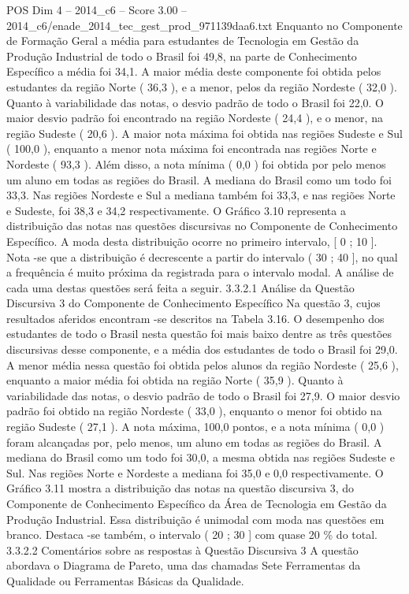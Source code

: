 \begin{textsample}{POS Dim 4 – 2014\_c6 – Score 3.00 – 2014\_c6/enade\_2014\_tec\_gest\_prod\_971139daa6.txt}
Enquanto no Componente de Formação Geral a média para estudantes de Tecnologia em Gestão da Produção Industrial de todo o Brasil foi 49,8, na parte de Conhecimento Específico a média foi 34,1.
A maior média deste componente foi obtida pelos estudantes da região Norte ( 36,3 ), e a menor, pelos da região Nordeste ( 32,0 ).
Quanto à variabilidade das notas, o desvio padrão de todo o Brasil foi 22,0.
O maior desvio padrão foi encontrado na região Nordeste ( 24,4 ), e o menor, na região Sudeste ( 20,6 ).
A maior nota máxima foi obtida nas regiões Sudeste e Sul ( 100,0 ), enquanto a menor nota máxima foi encontrada nas regiões Norte e Nordeste ( 93,3 ).
Além disso, a nota mínima ( 0,0 ) foi obtida por pelo menos um aluno em todas as regiões do Brasil.
A mediana do Brasil como um todo foi 33,3.
Nas regiões Nordeste e Sul a mediana também foi 33,3, e nas regiões Norte e Sudeste, foi 38,3 e 34,2 respectivamente.
O Gráfico 3.10 representa a distribuição das notas nas questões discursivas no Componente de Conhecimento Específico.
A moda desta distribuição ocorre no primeiro intervalo, [ 0 ; 10 ].
Nota -se que a distribuição é decrescente a partir do intervalo ( 30 ; 40 ], no qual a frequência é muito próxima da registrada para o intervalo modal.
A análise de cada uma destas questões será feita a seguir. 3.3.2.1 Análise da Questão Discursiva 3 do Componente de Conhecimento Específico Na questão 3, cujos resultados aferidos encontram -se descritos na Tabela 3.16.
O desempenho dos estudantes de todo o Brasil nesta questão foi mais baixo dentre as três questões discursivas desse componente, e a média dos estudantes de todo o Brasil foi 29,0.
A menor média nessa questão foi obtida pelos alunos da região Nordeste ( 25,6 ), enquanto a maior média foi obtida na região Norte ( 35,9 ).
Quanto à variabilidade das notas, o desvio padrão de todo o Brasil foi 27,9.
O maior desvio padrão foi obtido na região Nordeste ( 33,0 ), enquanto o menor foi obtido na região Sudeste ( 27,1 ).
A nota máxima, 100,0 pontos, e a nota mínima ( 0,0 ) foram alcançadas por, pelo menos, um aluno em todas as regiões do Brasil.
A mediana do Brasil como um todo foi 30,0, a mesma obtida nas regiões Sudeste e Sul.
Nas regiões Norte e Nordeste a mediana foi 35,0 e 0,0 respectivamente.
O Gráfico 3.11 mostra a distribuição das notas na questão discursiva 3, do Componente de Conhecimento Específico da Área de Tecnologia em Gestão da Produção Industrial.
Essa distribuição é unimodal com moda nas questões em branco.
Destaca -se também, o intervalo ( 20 ; 30 ] com quase 20 \% do total. 3.3.2.2 Comentários sobre as respostas à Questão Discursiva 3 A questão abordava o Diagrama de Pareto, uma das chamadas Sete Ferramentas da Qualidade ou Ferramentas Básicas da Qualidade.

\end{textsample}
